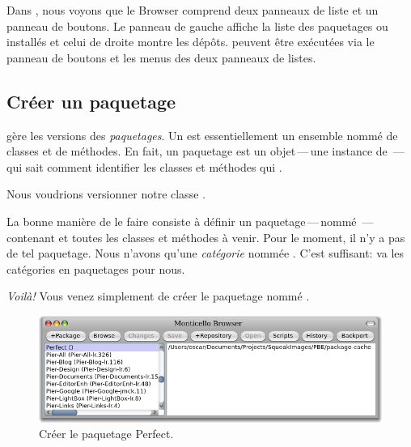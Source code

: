 \documentclass[a4paper,10pt,twoside]{book}
\begin{document}
Dans , nous voyons que le \MC Browser 
comprend deux panneaux de liste et un panneau de boutons. Le panneau
de gauche affiche la liste des paquetages ou  installés
et celui de droite montre les dépôts.
 peuvent être exécutées via le panneau de
boutons et les menus des deux panneaux de listes. %

\subsection{Créer un paquetage}

\MC gère les versions des \emph{paquetages}.  Un  est
essentiellement un ensemble nommé de classes et de méthodes.
En fait, un paquetage est un objet\,---\,une instance de
\,---\,qui sait comment identifier les classes et
méthodes qui .

Nous voudrions versionner notre classe .

La bonne manière de le faire consiste à définir un
paquetage\,---\,nommé \,---\,contenant
 et toutes les classes et méthodes à venir. Pour le
moment, il n'y a pas de tel paquetage. Nous n'avons qu'une
\emph{catégorie} nommée %
. %
C'est suffisant: \MC va  les catégories en
paquetages pour nous.


\emph{Voilà!} Vous venez simplement de créer le paquetage \MC nommé . 

\begin{figure}[ht]\centering
	\includegraphics[width=\textwidth]{perfectPackage}
	\caption{Créer le paquetage Perfect.}
\end{figure}
\end{document}
